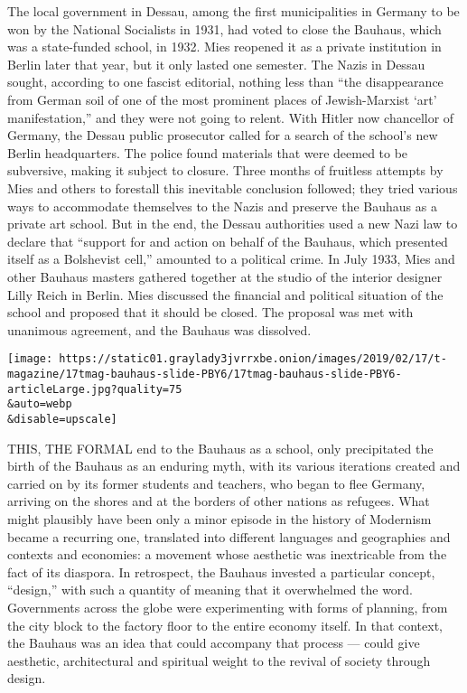 The local government in Dessau, among the first municipalities in
Germany to be won by the National Socialists in 1931, had voted to close
the Bauhaus, which was a state-funded school, in 1932. Mies reopened it
as a private institution in Berlin later that year, but it only lasted
one semester. The Nazis in Dessau sought, according to one fascist
editorial, nothing less than ``the disappearance from German soil of one
of the most prominent places of Jewish-Marxist `art' manifestation,''
and they were not going to relent. With Hitler now chancellor of
Germany, the Dessau public prosecutor called for a search of the
school's new Berlin headquarters. The police found materials that were
deemed to be subversive, making it subject to closure. Three months of
fruitless attempts by Mies and others to forestall this inevitable
conclusion followed; they tried various ways to accommodate themselves
to the Nazis and preserve the Bauhaus as a private art school. But in
the end, the Dessau authorities used a new Nazi law to declare that
``support for and action on behalf of the Bauhaus, which presented
itself as a Bolshevist cell,'' amounted to a political crime. In July
1933, Mies and other Bauhaus masters gathered together at the studio of
the interior designer Lilly Reich in Berlin. Mies discussed the
financial and political situation of the school and proposed that it
should be closed. The proposal was met with unanimous agreement, and the
Bauhaus was dissolved.

\texttt{[image: https://static01.graylady3jvrrxbe.onion/images/2019/02/17/t-magazine/17tmag-bauhaus-slide-PBY6/17tmag-bauhaus-slide-PBY6-articleLarge.jpg?quality=75\\\&auto=webp\\\&disable=upscale]}

THIS, THE FORMAL end to the Bauhaus as a school, only precipitated the
birth of the Bauhaus as an enduring myth, with its various iterations
created and carried on by its former students and teachers, who began to
flee Germany, arriving on the shores and at the borders of other nations
as refugees. What might plausibly have been only a minor episode in the
history of Modernism became a recurring one, translated into different
languages and geographies and contexts and economies: a movement whose
aesthetic was inextricable from the fact of its diaspora. In retrospect,
the Bauhaus invested a particular concept, ``design,'' with such a
quantity of meaning that it overwhelmed the word. Governments across the
globe were experimenting with forms of planning, from the city block to
the factory floor to the entire economy itself. In that context, the
Bauhaus was an idea that could accompany that process --- could give
aesthetic, architectural and spiritual weight to the revival of society
through design.

